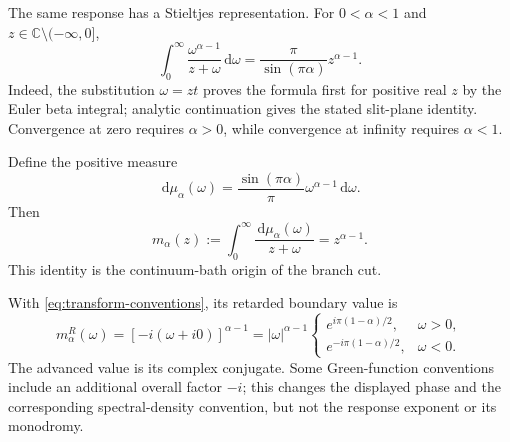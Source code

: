 \documentclass[11pt,reqno]{amsart}
\theoremstyle{remark}
\newcommand{\C}{\mathbb C}
\newcommand{\dd}{\,\mathrm d}
\begin{document}
The same response has a Stieltjes representation.  For $0<\alpha<1$ and
$z\in\C\setminus(-\infty,0]$,
\begin{equation}\label{eq:stieltjes-power}
 \int_0^\infty\frac{\omega^{\alpha-1}}{z+\omega}\dd\omega
 =\frac{\pi}{\sin(\pi\alpha)}z^{\alpha-1}.
\end{equation}
Indeed, the substitution $\omega=zt$ proves the formula first for positive
real $z$ by the Euler beta integral; analytic continuation gives the stated
slit-plane identity.  Convergence at zero requires $\alpha>0$, while
convergence at infinity requires $\alpha<1$.

Define the positive measure
\begin{equation}\label{eq:bath-measure}
 \dd\mu_\alpha(\omega)
 =\frac{\sin(\pi\alpha)}{\pi}
  \omega^{\alpha-1}\dd\omega.
\end{equation}
Then
\begin{equation}\label{eq:bath-m}
 m_\alpha(z):=\int_0^\infty\frac{\dd\mu_\alpha(\omega)}{z+\omega}
 =z^{\alpha-1}.
\end{equation}
This identity is the continuum-bath origin of the branch cut.

With \eqref{eq:transform-conventions}, its retarded boundary value is
\begin{equation}\label{eq:retarded-power-boundary}
 m_\alpha^R(\omega)
 =[-i(\omega+i0)]^{\alpha-1}
 =|\omega|^{\alpha-1}
 \begin{cases}
 e^{i\pi(1-\alpha)/2},&\omega>0,\\
 e^{-i\pi(1-\alpha)/2},&\omega<0.
 \end{cases}
\end{equation}
The advanced value is its complex conjugate.  Some Green-function conventions
include an additional overall factor $-i$; this changes the displayed phase
and the corresponding spectral-density convention, but not the response
exponent or its monodromy.
\end{document}

